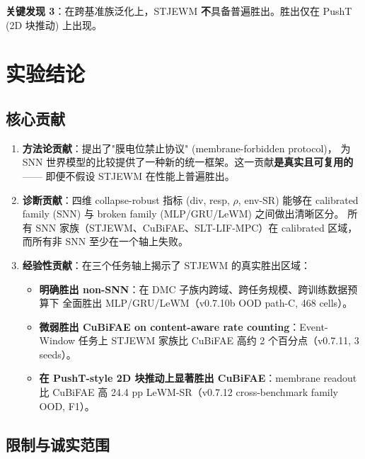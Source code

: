 \documentclass[11pt,a4paper]{article}
\begin{document}
\textbf{关键发现 3}：在跨基准族泛化上，STJEWM \textbf{不}具备普遍胜出。胜出仅在 PushT (2D 块推动) 上出现。

\section{实验结论}

\subsection{核心贡献}

\begin{enumerate}
    \item \textbf{方法论贡献}：提出了"膜电位禁止协议" (membrane-forbidden protocol)，
    为 SNN 世界模型的比较提供了一种新的统一框架。这一贡献\textbf{是真实且可复用的}——
    即便不假设 STJEWM 在性能上普遍胜出。

    \item \textbf{诊断贡献}：四维 collapse-robust 指标 (div, resp, $\rho$, env-SR)
    能够在 calibrated family (SNN) 与 broken family (MLP/GRU/LeWM) 之间做出清晰区分。
    所有 SNN 家族（STJEWM、CuBiFAE、SLT-LIF-MPC）在 calibrated 区域，
    而所有非 SNN 至少在一个轴上失败。

    \item \textbf{经验性贡献}：在三个任务轴上揭示了 STJEWM 的真实胜出区域：
    \begin{itemize}
        \item \textbf{明确胜出 non-SNN}：在 DMC 子族内跨域、跨任务规模、跨训练数据预算下
        全面胜出 MLP/GRU/LeWM（v0.7.10b OOD path-C, 468 cells）。
        \item \textbf{微弱胜出 CuBiFAE on content-aware rate counting}：Event-Window 任务上
        STJEWM 家族比 CuBiFAE 高约 2 个百分点（v0.7.11, 3 seeds）。
        \item \textbf{在 PushT-style 2D 块推动上显著胜出 CuBiFAE}：membrane readout 比 CuBiFAE
        高 24.4 pp LeWM-SR（v0.7.12 cross-benchmark family OOD, F1）。
    \end{itemize}
\end{enumerate}

\subsection{限制与诚实范围}
\end{document}
